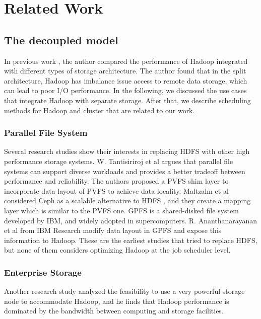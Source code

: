 \section{Related Work}
\label{sec:related_work}

\subsection{The decoupled model}

In previous work \cite{ShaferJ2010_PhD}, the author compared the performance of Hadoop integrated with different types of storage architecture.
The author found that in the split architecture, Hadoop has imbalance issue access to remote data storage, which can lead to poor I/O performance.
In the following, we discussed the use cases that integrate Hadoop with separate storage.
After that, we describe scheduling methods for Hadoop and cluster that are related to our work.

\subsubsection{Parallel File System}
Several research studies show their interests in replacing HDFS with other high performance storage systems.  
W. Tantisiriroj et al \cite{TantisirirojWittawat2011Duality} argues that parallel file systems can support diverse workloads and provides a better tradeoff between performance and reliability.
The authors proposed a PVFS shim layer to incorporate data layout of PVFS to achieve data locality.
Maltzahn et al considered Ceph as a scalable alternative to HDFS \cite{MaltzahnC2010_Ceph}, and they create a mapping layer which is similar to  the PVFS one.
GPFS is a shared-disked file system developed by IBM, and widely adopted in supercomputers. 
R. Ananthanarayanan et al \cite{AnanthanarayananR2009_CloudAnalytics} from IBM Research modify data layout in GPFS and expose this information to Hadoop.
These are the earliest studies that tried to replace HDFS, but none of them considers optimizing Hadoop at the job scheduler level.

\subsubsection{Enterprise Storage}

Another research study \cite{PorterG2010_SuperDataNodes} analyzed the feasibility to use a very powerful storage node to accommodate Hadoop, and he finds that Hadoop performance is dominated by the bandwidth between computing and storage facilities.

